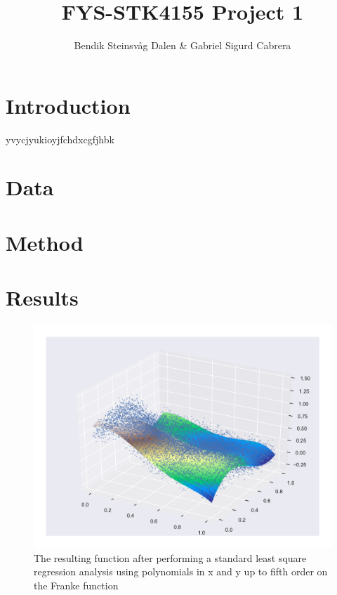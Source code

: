 \documentclass[a4paper,10pt,english]{article}
\begin{document}

\title{FYS-STK4155 Project 1}
\author{Bendik Steinsvåg Dalen \& Gabriel Sigurd Cabrera}
\maketitle

\begin{abstract}

\end{abstract}

\section{Introduction}
\label{sec:introduction}

yvycjyukioyjfchdxcgfjhbk
\section{Data}
\label{sec:data}

\section{Method}
\label{sec:method}

\section{Results}
\label{sec:results}

\begin{figure}[h!]
	\centering 
	\includegraphics[scale=0.6]{../results/part_a_reg.pdf}
	\caption{The resulting function after performing a standard least square regression analysis using polynomials in x
	and y up to fifth order on the Franke function}
	\label{part_a}
\end{figure}
\end{document}
